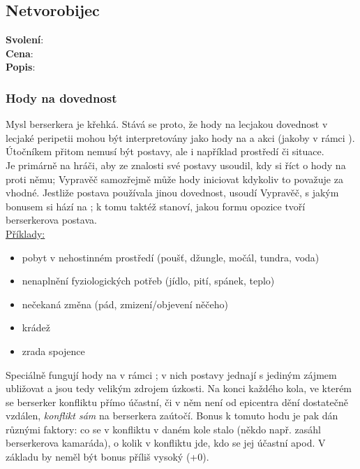 \begin{tcolorbox}
\subsection{Netvorobijec}
\label{sec:pov-netvorobijec}
\textbf{Svolení}:\\
\textbf{Cena}:\\
\textbf{Popis}:\\
\end{tcolorbox}

\subsubsection*{Hody na dovednost }
Mysl berserkera je křehká. Stává se proto, že hody na lecjakou dovednost v lecjaké peripetii mohou být interpretovány jako hody na  a akci  (jakoby v rámci ). Útočníkem přitom nemusí být postavy, ale i například prostředí či situace. \\
Je primárně na hráči, aby ze znalosti své postavy usoudil, kdy si říct o hody na  proti němu; Vypravěč samozřejmě může hody iniciovat kdykoliv to považuje za vhodné. Jestliže postava používala jinou dovednost, usoudí Vypravěč, s jakým bonusem si hází na ; k tomu taktéž stanoví, jakou formu opozice tvoří berserkerova postava.\\

\underline{Příklady:}
\begin{itemize}
\item pobyt v nehostinném prostředí (poušť, džungle, močál, tundra, voda)
\item nenaplnění fyziologických potřeb (jídlo, pití, spánek, teplo)
\item nečekaná změna (pád, zmizení/objevení něčeho)
\item krádež
\item zrada spojence
\end{itemize}

Speciálně fungují hody na  v rámci ; v nich postavy jednají s jediným zájmem ubližovat a jsou tedy velikým zdrojem úzkosti. Na konci každého kola, ve kterém se berserker konfliktu přímo účastní, či v něm není od epicentra dění dostatečně vzdálen, \textit{konflikt sám} na berserkera  zaútočí. Bonus k tomuto hodu je pak dán různými faktory: co se v konfliktu v daném kole stalo (někdo např. zasáhl berserkerova kamaráda), o kolik v konfliktu jde, kdo se jej účastní apod. V základu by neměl být bonus příliš vysoký (+0).\\

